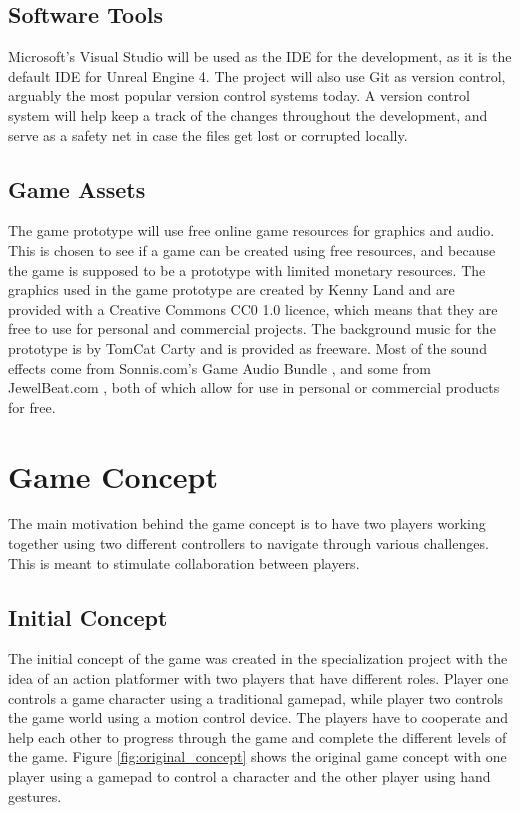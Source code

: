 \subsection{Software Tools}
Microsoft's Visual Studio will be used as the IDE for the development, as it is the default IDE for Unreal Engine 4. The project will also use Git as version control, arguably the most popular version control systems today. A version control system will help keep a track of the changes throughout the development, and serve as a safety net in case the files get lost or corrupted locally.

\subsection{Game Assets}
The game prototype will use free online game resources for graphics and audio. This is chosen to see if a game can be created using free resources, and because the game is supposed to be a prototype with limited monetary resources. The graphics used in the game prototype are created by Kenny Land \cite{kenney2016platformer} and are provided with a Creative Commons CC0 1.0 licence, which means that they are free to use for personal and commercial projects. The background music for the prototype is by TomCat Carty \cite{carty2015space} and is provided as freeware. Most of the sound effects come from Sonnis.com's Game Audio Bundle \cite{sonnis2016audio}, and some from JewelBeat.com \cite{jewelbeat2016audio}, both of which allow for use in personal or commercial products for free.

\section{Game Concept}
The main motivation behind the game concept is to have two players working together using two different controllers to navigate through various challenges. This is meant to stimulate collaboration between players.

\subsection{Initial Concept}
The initial concept of the game was created in the specialization project with the idea of an action platformer with two players that have different roles. Player one controls a game character using a traditional gamepad, while player two controls the game world using a motion control device. The players have to cooperate and help each other to progress through the game and complete the different levels of the game. Figure \ref{fig:original_concept} shows the original game concept with one player using a gamepad to control a character and the other player using hand gestures.

